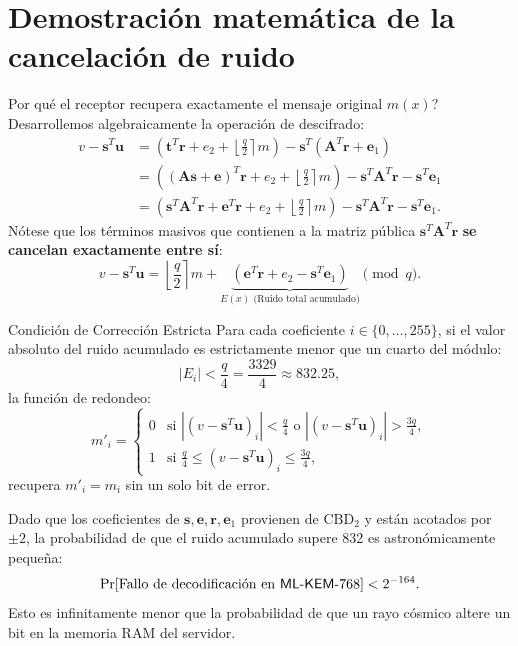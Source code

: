 \documentclass[11pt,a4paper,twoside,openright]{book}
\theoremstyle{plain}
\theoremstyle{definition}
\theoremstyle{remark}
\newcommand{\vv}[1]{\mathbf{#1}}
\newcommand{\mm}[1]{\mathbf{#1}}
\newcommand{\MLKEM}{\textsf{ML-KEM}}
\newcommand{\round}[1]{\left\lfloor #1 \right\rceil}
\newcommand{\CBD}{\mathrm{CBD}}
\begin{document}
\section{Demostraci\'on matem\'atica de la cancelaci\'on de ruido}

\textquestiondown Por qu\'e el receptor recupera exactamente el mensaje original $m(x)$? Desarrollemos algebraicamente la operaci\'on de descifrado:
\begin{align*}
  v - \vv{s}^T \vv{u} &= \left( \vv{t}^T \vv{r} + e_2 + \round{\frac{q}{2}} m \right) - \vv{s}^T \left( \mm{A}^T \vv{r} + \vv{e}_1 \right) \\
  &= \left( (\mm{A}\vv{s} + \vv{e})^T \vv{r} + e_2 + \round{\frac{q}{2}} m \right) - \vv{s}^T \mm{A}^T \vv{r} - \vv{s}^T \vv{e}_1 \\
  &= \left( \vv{s}^T \mm{A}^T \vv{r} + \vv{e}^T \vv{r} + e_2 + \round{\frac{q}{2}} m \right) - \vv{s}^T \mm{A}^T \vv{r} - \vv{s}^T \vv{e}_1.
\end{align*}
N\'otese que los t\'erminos masivos que contienen a la matriz p\'ublica $\vv{s}^T \mm{A}^T \vv{r}$ \textbf{se cancelan exactamente entre s\'i}:
\[
  v - \vv{s}^T \vv{u} = \round{\frac{q}{2}} m + \underbrace{(\vv{e}^T \vv{r} + e_2 - \vv{s}^T \vv{e}_1)}_{E(x) \text{ (Ruido total acumulado)}} \pmod q.
\]

\begin{miteo}{Condici\'on de Correcci\'on Estricta}
Para cada coeficiente $i \in \{0, \ldots, 255\}$, si el valor absoluto del ruido acumulado es estrictamente menor que un cuarto del m\'odulo:
\[
  |E_i| < \frac{q}{4} = \frac{3329}{4} \approx 832.25,
\]
la funci\'on de redondeo:
\[
  m'_i = \begin{cases}
    0 & \text{si } |(v - \vv{s}^T \vv{u})_i| < \frac{q}{4} \text{ o } |(v - \vv{s}^T \vv{u})_i| > \frac{3q}{4}, \\
    1 & \text{si } \frac{q}{4} \leq (v - \vv{s}^T \vv{u})_i \leq \frac{3q}{4},
  \end{cases}
\]
recupera $m'_i = m_i$ sin un solo bit de error.
\end{miteo}

Dado que los coeficientes de $\vv{s}, \vv{e}, \vv{r}, \vv{e}_1$ provienen de $\CBD_2$ y est\'an acotados por $\pm 2$, la probabilidad de que el ruido acumulado supere 832 es astron\'omicamente peque\~na:
\[
  \Pr[\text{Fallo de decodificaci\'on en \MLKEM{}-768}] < 2^{-164}.
\]
Esto es infinitamente menor que la probabilidad de que un rayo c\'osmico altere un bit en la memoria RAM del servidor.
\end{document}
